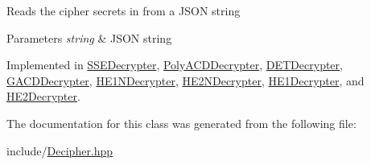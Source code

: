 Reads the cipher secrets in from a J\+S\+ON string 
\begin{DoxyParams}{Parameters}
{\em string} & J\+S\+ON string \\
\hline
\end{DoxyParams}


Implemented in \hyperlink{classSSEDecrypter_a1bdc685b8ea9c5bcc2b29f0c9a3ca7bf}{S\+S\+E\+Decrypter}, \hyperlink{classPolyACDDecrypter_a55e7f81c6d8d10e00e072547ac68239a}{Poly\+A\+C\+D\+Decrypter}, \hyperlink{classDETDecrypter_a8e32703400ead9c35a80549b011307d7}{D\+E\+T\+Decrypter}, \hyperlink{classGACDDecrypter_a7634cc069e61c1a3cf2443fed7c2b15f}{G\+A\+C\+D\+Decrypter}, \hyperlink{classHE1NDecrypter_a323f074a37cb4ebfbcfca4b6bdfb6737}{H\+E1\+N\+Decrypter}, \hyperlink{classHE2NDecrypter_a92b463d8e18d2f06d0680528edfd49c4}{H\+E2\+N\+Decrypter}, \hyperlink{classHE1Decrypter_af60ccc6d0afe7555a9d1468ad7047733}{H\+E1\+Decrypter}, and \hyperlink{classHE2Decrypter_a9cf1a6eae2667f6e891237589c4eeda0}{H\+E2\+Decrypter}.



The documentation for this class was generated from the following file\+:\begin{DoxyCompactItemize}
\item 
include/\hyperlink{Decipher_8hpp}{Decipher.\+hpp}\end{DoxyCompactItemize}
